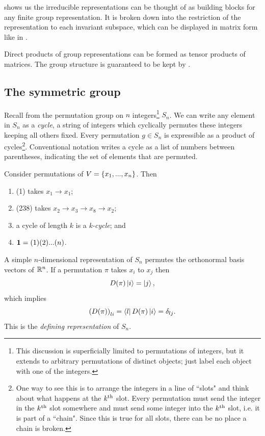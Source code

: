  shows us the irreducible
representations can be thought of as building blocks for any
finite group representation. It is broken down into the restriction
of the representation to each invariant subspace, which 
can be displayed in matrix form like in .

Direct products of group representations can be formed as
tensor products of matrices. The group structure is guaranteed
to be kept by .


\subsection{The symmetric group}

Recall from  the 
permutation group on
$n$ integers\footnote{This discussion is superficially limited
to permutations of integers, but it extends to arbitrary permutations
of distinct objects; just label each object with one of the integers.} 
$S_n$. We can write any element in $S_n$ as a {\it cycle}, 
a string of integers which cyclically permutes these
integers keeping all others fixed.
Every permutation $g\in S_n$ is expressible as a product
of cycles\footnote{One way to see this is to arrange the integers in a line 
of ``slots" and think about what happens at the $k{}^{\rm th}$ slot. Every
permutation must send the integer in the $k{}^{\rm th}$ slot somewhere and must send
some integer into the $k{}^{\rm th}$ slot, i.e. it is part of a ``chain". Since
this is true for all slots, there can be no place a chain is broken.}.
Conventional notation writes a cycle as a list of numbers between
parentheses, indicating the set of elements that are permuted.
\begin{example*}{}{}
  Consider permutations of $V=\left\{x_1,...,x_n\right\}$. Then
  \begin{enumerate}
    \item (1) takes $x_1\to x_1$;
    \item (238) takes $x_2\to x_3\to x_8\to x_2$;
    \item a cycle of length $k$ is a {\it k-cycle}; and
    \item ${\mathbf 1}=(1)(2)...(n)$.
  \end{enumerate}
\end{example*}


A simple $n$-dimensional representation of $S_n$ permutes the orthonormal
basis vectors of $\mathbb{R}^n$. If a permutation $\pi$ takes $x_i$
to $x_j$ then
\begin{equation}
  D(\pi)\ket{i}=\ket{j},
\end{equation}
which implies
\begin{equation}
  \left(D(\pi)\right)_{li}=\bra{l}D(\pi)\ket{i}=\delta_{lj}.
\end{equation}
This is the {\it defining representation}
of $S_n$.

